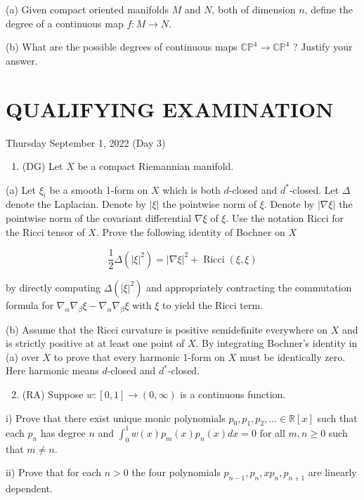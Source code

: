 \documentclass[10pt]{article}
\begin{document}
(a) Given compact oriented manifolds $M$ and $N$, both of dimension $n$, define the degree of a continuous map $f: M \rightarrow N$.

(b) What are the possible degrees of continuous maps $\mathbb{C P}^{4} \rightarrow \mathbb{C P}^{4}$ ? Justify your answer.

\section*{QUALIFYING EXAMINATION }
Thursday September 1, 2022 (Day 3)

\begin{enumerate}
  \item (DG) Let $X$ be a compact Riemannian manifold.
\end{enumerate}

(a) Let $\xi_{i}$ be a smooth 1-form on $X$ which is both $d$-closed and $d^{*}$-closed. Let $\Delta$ denote the Laplacian. Denote by $|\xi|$ the pointwise norm of $\xi$. Denote by $|\nabla \xi|$ the pointwise norm of the covariant differential $\nabla \xi$ of $\xi$. Use the notation Ricci for the Ricci tensor of $X$. Prove the following identity of Bochner on $X$

$$
\frac{1}{2} \Delta\left(|\xi|^{2}\right)=|\nabla \xi|^{2}+\operatorname{Ricci}(\xi, \xi)
$$

by directly computing $\Delta\left(|\xi|^{2}\right)$ and appropriately contracting the commutation formula for $\nabla_{\alpha} \nabla_{\beta} \xi-\nabla_{\alpha} \nabla_{\beta} \xi$ with $\xi$ to yield the Ricci term.

(b) Assume that the Ricci curvature is positive semidefinite everywhere on $X$ and is strictly positive at at least one point of $X$. By integrating Bochner's identity in (a) over $X$ to prove that every harmonic 1-form on $X$ must be identically zero. Here harmonic means $d$-closed and $d^{*}$-closed.

\begin{enumerate}
  \setcounter{enumi}{1}
  \item (RA) Suppose $w:[0,1] \rightarrow(0, \infty)$ is a continuous function.
\end{enumerate}

i) Prove that there exist unique monic polynomials $p_{0}, p_{1}, p_{2}, \ldots \in \mathbb{R}[x]$ such that each $p_{n}$ has degree $n$ and $\int_{0}^{1} w(x) p_{m}(x) p_{n}(x) d x=0$ for all $m, n \geq 0$ such that $m \neq n$.

ii) Prove that for each $n>0$ the four polynomials $p_{n-1}, p_{n}, x p_{n}, p_{n+1}$ are linearly dependent.
\end{document}
